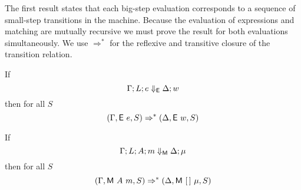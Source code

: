 The first result states that each big-step evaluation corresponds to a
sequence of small-step transitions in the machine.  Because the
evaluation of expressions and matching are mutually recursive we must
prove the result for both evaluations simultaneously.  We use
$\Rightarrow^{*}$ for the reflexive and transitive closure of the
transition relation.

\begin{theorem}
  If
  \[ \Gamma; L; e \Downarrow_{\textsf{E}} \Delta; w \]
  then for all $S$
  \[ (\Gamma, \textsf{E}~e,  S) \Rightarrow^{*}
    (\Delta, \textsf{E}~w, S)
  \]

  If
  \[ \Gamma; L; A; m \Downarrow_{\textsf{M}} \Delta; \mu
  \]
  then for all $S$
  \[
    (\Gamma, \textsf{M}~A~m, S) \Rightarrow^{*}
    (\Delta, \textsf{M}~[\,]~\mu, S)
  \]
\end{theorem}


